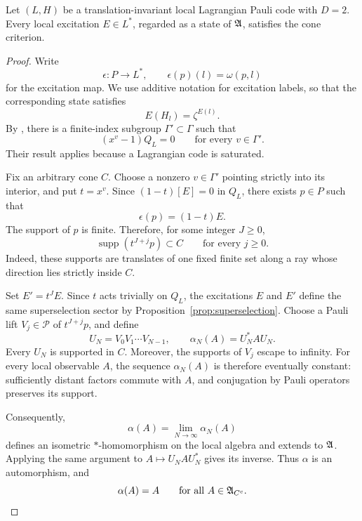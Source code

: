 \documentclass[11pt]{amsart}
\begin{document}
\begin{thm}\label{thm: every omega_e satisfies the cone condition}
Let $(L,H)$ be a translation-invariant local Lagrangian Pauli code with $D=2$. Every local excitation $E\in L^*$, regarded as a state of $\mathfrak{A}$, satisfies the cone criterion.
\begin{proof}
Write
\[
\epsilon\colon P\longrightarrow L^*,\qquad
\epsilon(p)(l)=\omega(p,l)
\]
for the excitation map. We use additive notation for excitation labels, so that the corresponding state satisfies
\[
E(H_l)=\zeta^{E(l)}.
\]
By \cite[Proposition~36 and Corollary~37]{ruba_yang_2024}, there is a finite-index subgroup $\Gamma'\subset\Gamma$ such that
\[
(x^v-1)Q_L=0
\qquad\text{for every }v\in\Gamma'.
\]
Their result applies because a Lagrangian code is saturated.

Fix an arbitrary cone $C$. Choose a nonzero $v\in\Gamma'$ pointing strictly into its interior, and put $t=x^v$. Since $(1-t)[E]=0$ in $Q_L$, there exists $p\in P$ such that
\[
\epsilon(p)=(1-t)E.
\]
The support of $p$ is finite. Therefore, for some integer $J\geq0$,
\[
\operatorname{supp}(t^{J+j}p)\subset C
\qquad\text{for every }j\geq0.
\]
Indeed, these supports are translates of one fixed finite set along a ray whose direction lies strictly inside $C$.

Set $E'=t^JE$. Since $t$ acts trivially on $Q_L$, the excitations $E$ and $E'$ define the same superselection sector by Proposition~\ref{prop:superselection}. Choose a Pauli lift $V_j\in \mathcal P$ of $t^{J+j}p$, and define
\[
U_N=V_0V_1\cdots V_{N-1},
\qquad
\alpha_N(A)=U_N^*AU_N.
\]
Every $U_N$ is supported in $C$. Moreover, the supports of $V_j$ escape to infinity. For every local observable $A$, the sequence $\alpha_N(A)$ is therefore eventually constant: sufficiently distant factors commute with $A$, and conjugation by Pauli operators preserves its support.

Consequently,
\[
\alpha(A)=\lim_{N\to\infty}\alpha_N(A)
\]
defines an isometric $*$-homomorphism on the local algebra and extends to $\mathfrak{A}$. Applying the same argument to $A\mapsto U_NAU_N^*$ gives its inverse. Thus $\alpha$ is an automorphism, and
\[
\alpha(A)=A
\qquad\text{for all }A\in\mathfrak{A}_{C^c}.
\]


\end{proof}
\end{thm}
\end{document}
